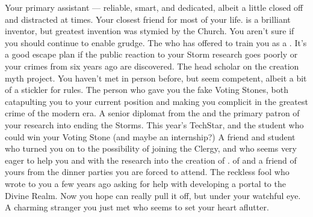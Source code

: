 \documentclass[char]{GL2020}
\begin{document}
\begin{contacts}
    \contact{\cAssistantScientist{}} Your primary assistant — reliable, smart, and dedicated, albeit a little closed off and distracted at times.
    \contact{\cChupInventor{}} Your closest friend for most of your life. \cChupInventor{} is a brilliant inventor, but \cChupInventor{\their} greatest invention was stymied by the Church. You aren't sure if you should continue to enable \cChupInventor{\their} grudge.
    \contact{\cBeetle{}} The \cBeetle{\cleric} who has offered to train you as a \cHeadScientist{\cleric}. It's a good escape plan if the public reaction to your Storm research goes poorly or your crimes from six years ago are discovered.
    \contact{\cEbbPriest{}} The head scholar on the creation myth project. You haven't met in person before, but \cEbbPriest{\they} seem\cEbbPriest{\verbs} competent, albeit a bit of a stickler for rules.
    \contact{\cEvil{}} The person who gave you the fake Voting Stones, both catapulting you to your current position and making you complicit in the greatest crime of the modern era. 
    \contact{\cDiplomat{}} A senior diplomat from the \pTech{} and the primary patron of your research into ending the Storms. 
    \contact{\cTechStar{}} This year's TechStar, and the \pTech{} student who could win your Voting Stone (and maybe an internship?)
    \contact{\cScholarship{}} A friend and student who turned you on to the possibility of joining the Clergy, and who seems very eager to help you and \cEbbPriest{} with the research into the creation of \pEarth{}.
    \contact{\cHeir{}} \cHeir{\Nibling} of \cDiplomat{} and a friend of yours from the dinner parties you are forced to attend. 
    \contact{\cCurse{}} The reckless fool who wrote to you a few years ago asking for help with developing a portal to the Divine Realm. Now you hope \cCurse{\they} can really pull it off, but under your watchful eye.
    \contact{\cChupAvenger{}} A charming stranger you just met who seems to set your heart aflutter.
\end{contacts}
\end{document}
